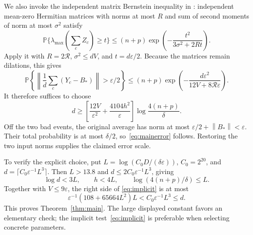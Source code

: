 \documentclass[11pt]{article}
\newcommand{\Prob}{\mathbb P}
\newcommand{\norm}[1]{\left\lVert#1\right\rVert}
\begin{document}
We also invoke the independent matrix Bernstein inequality in
\cite[Corollary 5.2]{Mackey}: independent mean-zero Hermitian matrices
with norms at most $R$ and sum of second moments of norm at most
$\sigma^2$ satisfy
\[
 \Prob\{\lambda_{\max}(\textstyle\sum_cZ_c)\ge t\}
 \le(n+p)\exp\left(-\frac{t^2}{3\sigma^2+2Rt}\right).
\]
Apply it with $R=2\mathcal R$, $\sigma^2\le dV$, and
$t=d\varepsilon/2$. Because the matrices remain dilations, this gives
\begin{equation}\label{eq:trimtail}
 \Prob\left\{\norm{\frac1d\sum_c(Y_c-B_*)}>\varepsilon/2\right\}
 \le(n+p)\exp\left(-\frac{d\varepsilon^2}
                              {12V+8\mathcal R\varepsilon}\right).
\end{equation}
It therefore suffices to choose
\begin{equation}\label{eq:implicit}
 d\ge\left[\frac{12V}{\varepsilon^2}
              +\frac{4104h^2}{\varepsilon}\right]
               \log\frac{4(n+p)}\delta.
\end{equation}
Off the two bad events, the original average has norm at most
$\varepsilon/2+\norm{B_*}<\varepsilon$. Their total probability is
at most $\delta/2$, so~\eqref{eq:mainerror} follows. Restoring the two
input norms supplies the claimed error scale.

To verify the explicit choice, put
$L=\log(C_0D/(\delta\varepsilon))$, $C_0=2^{20}$, and
$d=\lceil C_0\varepsilon^{-1}L^3\rceil$. Then $L>13.8$ and
$d\le2C_0\varepsilon^{-1}L^3$, giving
\[
 \log d<3L,\qquad h<4L,\qquad
 \log(4(n+p)/\delta)\le L.
\]
Together with $V\le9\varepsilon$, the right side of
\eqref{eq:implicit} is at most
\[
 \varepsilon^{-1}(108+65664L^2)L
 <C_0\varepsilon^{-1}L^3\le d.
\]
This proves Theorem~\ref{thm:main}. The large displayed constant favors
an elementary check; the implicit test~\eqref{eq:implicit} is preferable
when selecting concrete parameters.
\end{document}
